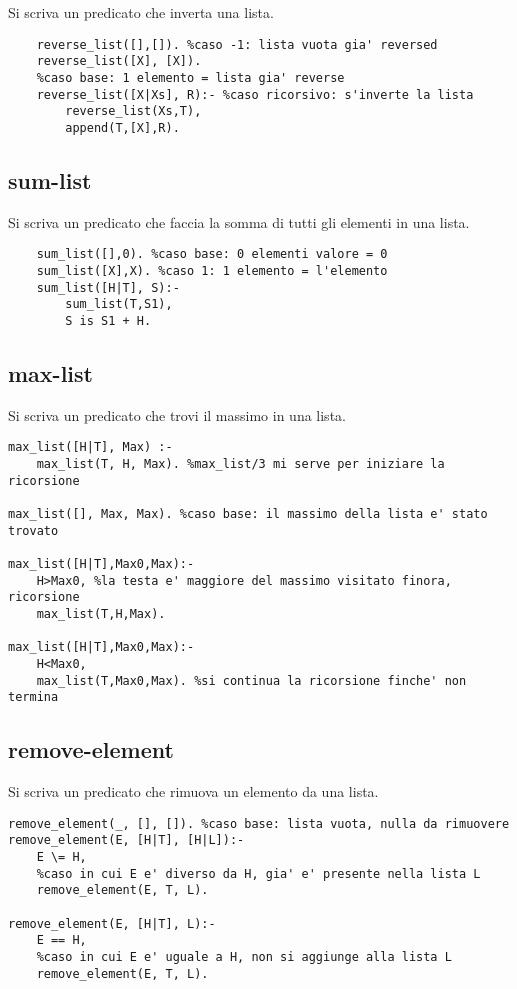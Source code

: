 Si scriva un predicato che inverta una lista.

\begin{lstlisting}
    reverse_list([],[]). %caso -1: lista vuota gia' reversed
    reverse_list([X], [X]). 
    %caso base: 1 elemento = lista gia' reverse
    reverse_list([X|Xs], R):- %caso ricorsivo: s'inverte la lista 
        reverse_list(Xs,T),
        append(T,[X],R).
\end{lstlisting}



\subsection{sum-list}

Si scriva un predicato che faccia la somma di tutti gli elementi in una lista.

\begin{lstlisting}
    sum_list([],0). %caso base: 0 elementi valore = 0
    sum_list([X],X). %caso 1: 1 elemento = l'elemento
    sum_list([H|T], S):-
        sum_list(T,S1),
        S is S1 + H.
\end{lstlisting}

\subsection{max-list}

Si scriva un predicato che trovi il massimo in una lista.

\begin{lstlisting}
max_list([H|T], Max) :-
    max_list(T, H, Max). %max_list/3 mi serve per iniziare la ricorsione

max_list([], Max, Max). %caso base: il massimo della lista e' stato trovato

max_list([H|T],Max0,Max):-
    H>Max0, %la testa e' maggiore del massimo visitato finora, ricorsione
    max_list(T,H,Max).

max_list([H|T],Max0,Max):-
    H<Max0, 
    max_list(T,Max0,Max). %si continua la ricorsione finche' non termina
\end{lstlisting}

\subsection{remove-element}

Si scriva un predicato che rimuova un elemento da una lista.

\begin{lstlisting}
remove_element(_, [], []). %caso base: lista vuota, nulla da rimuovere
remove_element(E, [H|T], [H|L]):- 
    E \= H, 
    %caso in cui E e' diverso da H, gia' e' presente nella lista L
    remove_element(E, T, L).

remove_element(E, [H|T], L):-
    E == H, 
    %caso in cui E e' uguale a H, non si aggiunge alla lista L
    remove_element(E, T, L).
\end{lstlisting}

